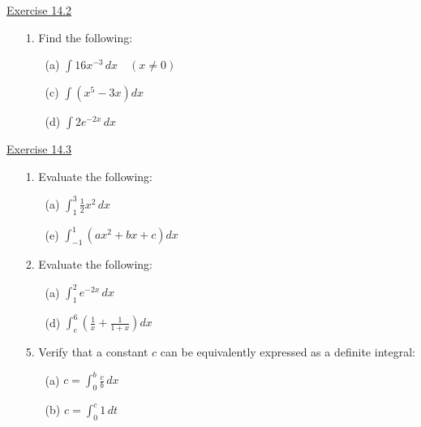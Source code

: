 \underline{Exercise 14.2}
\begin{enumerate}
\item[1.] Find the following:
\begin{enumerate}
\item[(a)] $\displaystyle\int 16x^{-3}\, dx \quad (x \neq 0)$
\item[(c)] $\displaystyle\int \left(x^{5}-3x\right) dx$
\item[(d)] $\displaystyle\int 2e^{-2x}\, dx$
\end{enumerate}

\end{enumerate}

\underline{Exercise 14.3}
\begin{enumerate}
\item[1.] Evaluate the following:
\begin{enumerate}
\item[(a)] $\displaystyle\int_{1}^{3} \tfrac{1}{2}x^{2}\, dx$
\item[(e)] $\displaystyle\int_{-1}^{1} \left(ax^{2}+bx+c\right) dx$
\end{enumerate}

\item[2.] Evaluate the following:
\begin{enumerate}
\item[(a)] $\displaystyle\int_{1}^{2} e^{-2x}\, dx$
\item[(d)] $\displaystyle\int_{e}^{6} \left(\frac{1}{x}+\frac{1}{1+x}\right) dx$
\end{enumerate}

\item[5.] Verify that a constant $c$ can be equivalently expressed as a definite integral:
\begin{enumerate}
\item[(a)] $c=\displaystyle\int_{0}^{b} \frac{c}{b}\, dx$
\item[(b)] $c=\displaystyle\int_{0}^{c} 1\, dt$
\end{enumerate}

\end{enumerate}
